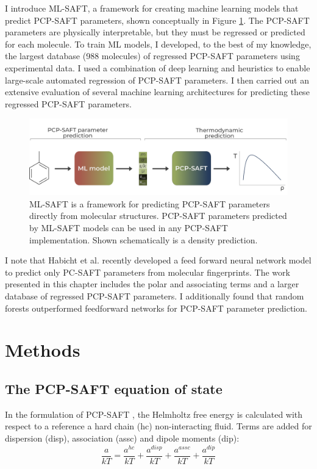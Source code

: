 I introduce ML-SAFT, a framework for creating machine learning models that predict PCP-SAFT parameters, shown conceptually in Figure \ref{fig:ML-SAFT_workflow}. The PCP-SAFT parameters are physically interpretable, but they must be regressed or predicted for each molecule.  To train ML models, I developed, to the best of my knowledge, the largest database (988 molecules) of regressed PCP-SAFT parameters using experimental data. I used a combination of deep learning and heuristics to enable large-scale automated regression of PCP-SAFT parameters. I then carried out an extensive evaluation of several machine learning architectures for predicting these regressed PCP-SAFT parameters.

\begin{figure}
    \centering
    \includegraphics[width=\textwidth]{gfx/Chapter08/mlsaft_workflow.png}
    \caption{ML-SAFT is a framework for predicting PCP-SAFT parameters directly from molecular structures. PCP-SAFT parameters predicted by ML-SAFT models can be used in any PCP-SAFT implementation. Shown schematically is a density prediction.}
    \label{fig:ML-SAFT_workflow}
\end{figure}

I note that Habicht et al. \cite{Habicht2023} recently developed a feed forward neural network model to predict only PC-SAFT parameters from molecular fingerprints. The work presented in this chapter includes the polar and associating terms and a larger database of regressed PCP-SAFT parameters. I additionally found that random forests outperformed feedforward networks for PCP-SAFT parameter prediction.

\section{Methods}

\subsection{The PCP-SAFT equation of state}

In the formulation of PCP-SAFT \cite{Gross2001, Gross2006}, the Helmholtz free energy is calculated with respect to a reference a hard chain (hc) non-interacting fluid. Terms are added for dispersion (disp), association (assc) and dipole moments (dip):
\begin{equation}
    \frac{a}{kT} = \frac{a^{hc}}{kT} +  \frac{a^{disp}}{kT}  + \frac{a^{assc}}{kT} + \frac{a^{dip}}{kT}
    \label{eq:pcsaft_hemholtz}
\end{equation}

